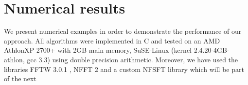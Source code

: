 \documentclass[11pt,a4paper,twoside,bibtotoc]{scrartcl}
\theoremstyle{plain}
\theoremstyle{definition}
\theoremstyle{remark}
\numberwithin{equation}{section}
\numberwithin{table}{section}
\numberwithin{figure}{section}
\begin{document}
\section{Numerical results}
We present numerical examples in order to demonstrate the performance of
our approach. All algorithms were implemented in C and tested on an 
AMD Athlon\texttrademark XP 2700+ with 2GB main memory, SuSE-Linux 
(kernel 2.4.20-4GB-athlon, gcc 3.3) using double precision arithmetic. 
Moreover, we have used the libraries FFTW 3.0.1 \cite{fftw}, NFFT 2
\cite{kupo02C} and a custom NFSFT library which will be part of the next \begin{figure}[tb]
  \centering
  \hfill
  \\
  \hfill

\end{figure}
\end{document}
